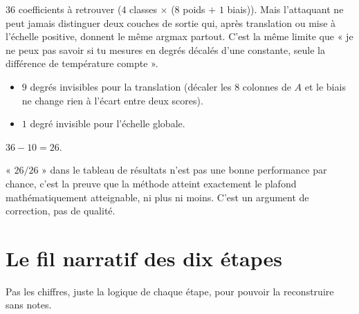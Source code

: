 \documentclass[11pt]{article}
\begin{document}
$36$ coefficients à retrouver ($4$ classes $\times$ ($8$ poids $+$ $1$
biais)). Mais l'attaquant ne peut jamais distinguer deux couches de sortie
qui, après translation ou mise à l'échelle positive, donnent le même argmax
partout. C'est la même limite que « je ne peux pas savoir si tu mesures en
degrés décalés d'une constante, seule la différence de température
compte ».

\begin{itemize}
  \item $9$ degrés invisibles pour la translation (décaler les 8 colonnes
    de $A$ et le biais ne change rien à l'écart entre deux scores).
  \item $1$ degré invisible pour l'échelle globale.
\end{itemize}

$36 - 10 = 26$.

\begin{cle}
« $26/26$ » dans le tableau de résultats n'est pas une bonne performance
par chance, c'est la preuve que la méthode atteint exactement le plafond
mathématiquement atteignable, ni plus ni moins. C'est un argument de
correction, pas de qualité.
\end{cle}

\section{Le fil narratif des dix étapes}

Pas les chiffres, juste la logique de chaque étape, pour pouvoir la
reconstruire sans notes.
\end{document}
